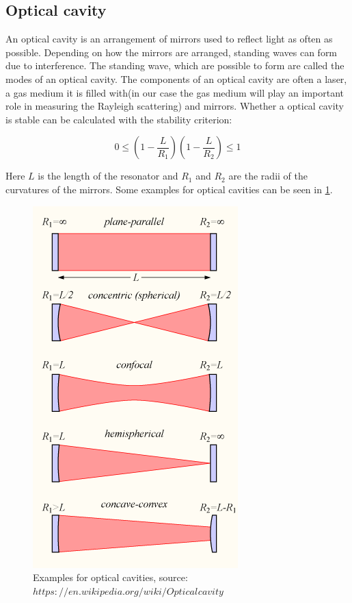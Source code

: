 \documentclass[10pt,a4paper]{article}
\begin{document}
\subsection{Optical cavity}

An optical cavity is an arrangement of mirrors used to reflect light as often as possible. Depending on how the mirrors are arranged, standing waves can form due to interference. The standing wave, which are possible to form are called the modes of an optical cavity. The components of an optical cavity are often a laser, a gas medium it is filled with(in our case the gas medium will play an important role in measuring the Rayleigh scattering) and mirrors. Whether a optical cavity is stable can be calculated with the stability criterion:

\begin{equation}
0 \leq (1 -  \frac{L}{R_1})(1- \frac{L}{R_2}) \leq 1
\end{equation}

Here $L$ is the length of the resonator and $R_1$ and $R_2$ are the radii of the curvatures of the mirrors. Some examples for optical cavities can be seen in \ref{optical_cavities}.

\begin{figure}[h]
	\includegraphics[scale = 0.5]{Optical-cavity1.png}
	\centering
	\caption{Examples for optical cavities, source: \href{https://en.wikipedia.org/wiki/Optical_cavity}{$https://en.wikipedia.org/wiki/Optical_{}cavity$}}
	\label{optical_cavities}
\end{figure}
\end{document}
